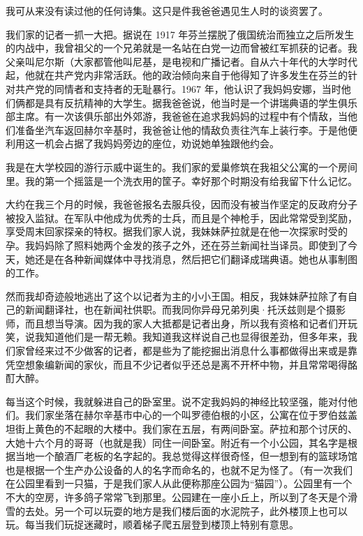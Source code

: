 我可从来没有读过他的任何诗集。这只是件我爸爸遇见生人时的谈资罢了。

我们家的记者一抓一大把。据说在 1917 年芬兰摆脱了俄国统治而独立之后所发生的内战中，我曾祖父的一个兄弟就是一名站在白党一边而曾被红军抓获的记者。我父亲叫尼尔斯（大家都管他叫尼基，是电视和广播记者。自从六十年代的大学时代起，他就在共产党内非常活跃。他的政治倾向来自于他得知了许多发生在芬兰的针对共产党的同情者和支持者的无耻暴行。1967 年，他认识了我妈妈安娜，当时他们俩都是具有反抗精神的大学生。据我爸爸说，他当时是一个讲瑞典语的学生俱乐部主席。有一次该俱乐部出外郊游，我爸爸在追求我妈妈的过程中有个情敌，当他们准备坐汽车返回赫尔辛基时，我爸爸让他的情敌负责往汽车上装行李。于是他便利用这一机会占据了我妈妈旁边的座位，劝说她单独跟他约会。

我是在大学校园的游行示威中诞生的。我们家的爱巢修筑在我祖父公寓的一个房间里。我的第一个摇篮是一个洗衣用的筐子。幸好那个时期没有给我留下什么记忆。

大约在我三个月的时候，我爸爸报名去服兵役，因而没有被当作坚定的反政府分子被投入监狱。在军队中他成为优秀的士兵，而且是个神枪手，因此常常受到奖励，享受周末回家探亲的特权。据我们家人说，我妹妹萨拉就是在他一次探家时受的孕。我妈妈除了照料她两个金发的孩子之外，还在芬兰新闻社当译员。即使到了今天，她还是在各种新闻媒体中寻找消息，然后把它们翻译成瑞典语。她也从事制图的工作。

然而我却奇迹般地逃出了这个以记者为主的小小王国。相反，我妹妹萨拉除了有自己的新闻翻译社，也在新闻社供职。而我同你异母兄弟列奥·托沃兹则是个摄影师，而且想当导演。因为我的家人大抵都是记者出身，所以我有资格和记者们开玩笑，说我知道他们是一帮无赖。我知道我这样说自己也显得很差劲，但多年来，我们家曾经来过不少做客的记者，都是些为了能挖掘出消息什么事都做得出来或是靠凭空想象编新闻的家伙，而且不少记者似乎还总是离不开杯中物，并且常常喝得酩酊大醉。

每当这个时候，我就躲进自己的卧室里。说不定我妈妈的神经比较坚强，能对付他们。我们家坐落在赫尔辛基市中心的一个叫罗德伯根的小区，公寓在位于罗伯兹盖坦街上黄色的不起眼的大楼中。我们家在五层，有两间卧室。萨拉和那个讨厌的、大她十六个月的哥哥（也就是我）同住一间卧室。附近有一个小公园，其名字是根据当地一个酿酒厂老板的名字起的。我总觉得这样很奇怪，但一想到有的篮球场馆也是根据一个生产办公设备的人的名字而命名的，也就不足为怪了。（有一次我们在公园里看到一只猫，于是我们家人从此便称那座公园为“猫园”）。公园里有一个不大的空房，许多鸽子常常飞到那里。公园建在一座小丘上，所以到了冬天是个滑雪的去处。另一个可以玩耍的地方是我们楼后面的水泥院子，此外楼顶上也可以玩。每当我们玩捉迷藏时，顺着梯子爬五层登到楼顶上特别有意思。

